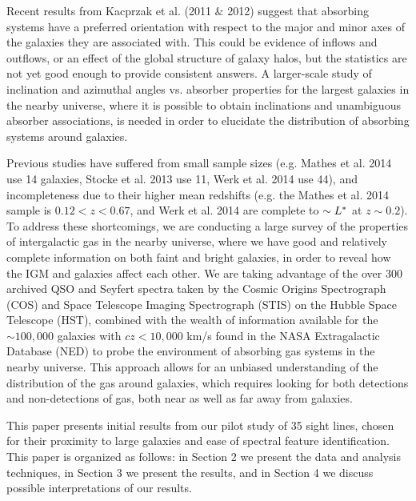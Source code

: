 \documentclass[iop]{emulateapj-rtx4}
\begin{document}
Recent results from Kacprzak et al. (2011 $\&$ 2012) suggest that absorbing systems have a preferred orientation with respect to the major and minor axes of the galaxies they are associated with. This could be evidence of inflows and outflows, or an effect of the global structure of galaxy halos, but the statistics are not yet good enough to provide consistent answers. A larger-scale study of inclination and azimuthal angles vs. absorber properties for the largest galaxies in the nearby universe, where it is possible to obtain inclinations and unambiguous absorber associations, is needed in order to elucidate the distribution of absorbing systems around galaxies.


Previous studies have suffered from small sample sizes (e.g. Mathes et al. 2014 use 14 galaxies, Stocke et al. 2013 use 11, Werk et al. 2014 use 44), and incompleteness due to their higher mean redshifts (e.g. the Mathes et al. 2014 sample is $0.12 <z<0.67$, and Werk et al. 2014 are complete to $\sim L^{\**}$ at $z\sim0.2$). To address these shortcomings, we are conducting a large survey of the properties of intergalactic gas in the nearby universe, where we have good and relatively complete information on both faint and bright galaxies, in order to reveal how the IGM and galaxies affect each other. We are taking advantage of the over 300 archived QSO and Seyfert spectra taken by the Cosmic Origins Spectrograph (COS) and Space Telescope Imaging Spectrograph (STIS) on the Hubble Space Telescope (HST), combined with the wealth of information available for the $\sim100,000$ galaxies with $cz<10,000$ km/s found in the NASA Extragalactic Database (NED) to probe the environment of absorbing gas systems in the nearby universe. This approach allows for an unbiased understanding of the distribution of the gas around galaxies, which requires looking for both detections and non-detections of gas, both near as well as far away from galaxies.

This paper presents initial results from our pilot study of 35 sight lines, chosen for their proximity to large galaxies and ease of spectral feature identification. This paper is organized as follows: in Section 2 we present the data and analysis techniques, in Section 3 we present the results, and in Section 4 we discuss possible interpretations of our results.

\end{document}
